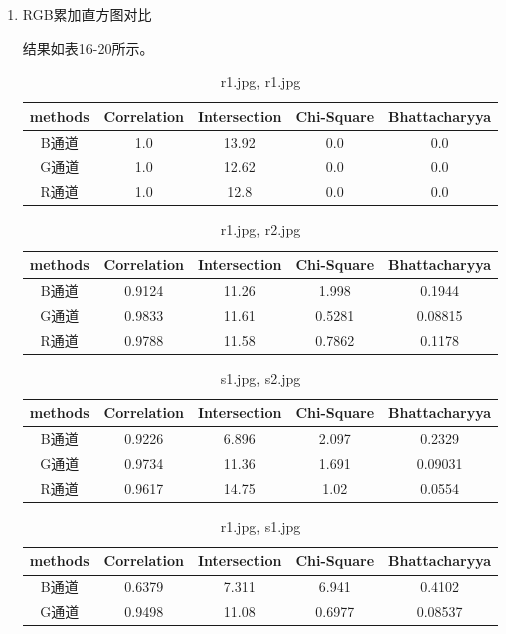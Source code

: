 \documentclass[a4paper, 12pt, UTF8]{article}
\begin{document}
\begin{enumerate}
\item RGB累加直方图对比

结果如表16-20所示。

\begin{table}[h!]
    \centering
    \caption{r1.jpg, r1.jpg}
    \begin{tabular}{ccccc}
        methods & Correlation & Intersection & Chi-Square & Bhattacharyya \\ \hline
        B通道 & 1.0 & 13.92 & 0.0 & 0.0 \\
        G通道 & 1.0 & 12.62 & 0.0 & 0.0 \\
        R通道 & 1.0 & 12.8 & 0.0 & 0.0 \\
    \end{tabular}
\end{table}
\begin{table}[h!]
    \centering
    \caption{r1.jpg, r2.jpg}
    \begin{tabular}{ccccc}
        methods & Correlation & Intersection & Chi-Square & Bhattacharyya \\ \hline
        B通道 & 0.9124 & 11.26 & 1.998 & 0.1944 \\
        G通道 & 0.9833 & 11.61 & 0.5281 & 0.08815 \\
        R通道 & 0.9788 & 11.58 & 0.7862 & 0.1178 \\
    \end{tabular}
\end{table}
\begin{table}[h!]
    \centering
    \caption{s1.jpg, s2.jpg}
    \begin{tabular}{ccccc}
        methods & Correlation & Intersection & Chi-Square & Bhattacharyya \\ \hline
        B通道 & 0.9226 & 6.896 & 2.097 & 0.2329 \\
        G通道 & 0.9734 & 11.36 & 1.691 & 0.09031 \\
        R通道 & 0.9617 & 14.75 & 1.02 & 0.0554 \\
    \end{tabular}
\end{table}
\begin{table}[h!]
    \centering
    \caption{r1.jpg, s1.jpg}
    \begin{tabular}{ccccc}
        methods & Correlation & Intersection & Chi-Square & Bhattacharyya \\ \hline
        B通道 & 0.6379 & 7.311 & 6.941 & 0.4102 \\
        G通道 & 0.9498 & 11.08 & 0.6977 & 0.08537 \\

\end{tabular}
\end{table}
\end{enumerate}
\end{document}
